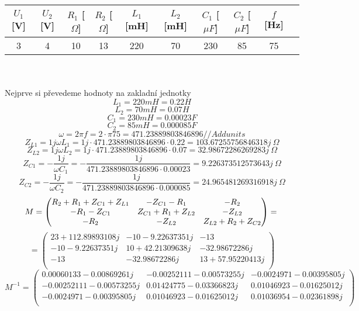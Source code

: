\documentclass{article}
\begin{document}
\begin{tabular}{| c | c | c | c | c | c | c | c | c | c |}
  \hline
   $U_{1}$[V] & $U_{2}$ [V] & $R_{1}$ [$\Omega$]& $R_{2}$ [$\Omega$]& $L_{1}$ [mH]& $L_{2}$ [mH]& $C_{1}$ [$\mu F$]& $C_{2}$ [$\mu F$]& $f$ [Hz]\\
  \hline
  3 & 4 & 10 & 13 & 220 & 70 & 230 & 85 & 75\\ 
  \hline
\end{tabular}\\
\\
Nejprve si převedeme hodnoty na zakladní jednotky\\
\[
  L_1 = 220 mH = 0.22 H
\]
\[
  L_2 = 70 mH = 0.07 H
\]
\[
  C_1 = 230 mH = 0.00023 F
\]
\[
  C_2 = 85 mH = 0.000085 F
\]
\[
  \omega = 2\pi f 
  = 2 \cdot \pi 75
  = 471.23889803846896 // Add units 
\]
\[
  Z_{L1} = 1j \omega L_1
  = 1j \cdot 471.23889803846896 \cdot 0.22 
  = 103.67255756846318j\ \Omega
\]
\[
  Z_{L2} = 1j \omega L_2
  = 1j \cdot 471.23889803846896 \cdot 0.07 
  = 32.98672286269283j \ \Omega
\]
\[
  Z_{C1} = -\displaystyle\frac{1j}{\omega C_1}
  = - \displaystyle\frac{1j}{471.23889803846896 \cdot 0.00023}
  = 9.226373512573643j\ \Omega
\]
\[
  Z_{C2} = -\displaystyle\frac{1j}{\omega C_2}
  = - \displaystyle\frac{1j}{471.23889803846896 \cdot 0.000085}
  = 24.965481269316918j\ \Omega
\]
\[
  M =
  \begin{pmatrix}
    R_2+R_1+Z_{C1}+Z_{L1} & -Z_{C1}-R_1 & -R_2\\
    -R_1-Z_{C1} & Z_{C1}+R_1+Z_{L2} & -Z_{L2}\\
    -R_2 & -Z_{L2} & Z_{L2}+R_2+Z_{C2}\\
  \end{pmatrix}
  =\\
\]
\[
  =
  \begin{pmatrix}
    23+112.89893108j & -10 -9.22637351j & -13\\
    -10 -9.22637351j & 10 +42.21309638j & -32.98672286j\\
    -13 & -32.98672286j & 13 +57.95220413j\\
  \end{pmatrix}
\]
\[
  M^{-1}
  =
  \begin{pmatrix}
    0.00060133-0.00869261j & -0.00252111-0.00573255j & -0.0024971 -0.00395805j\\
    -0.00252111-0.00573255j & 0.01424775-0.03366823j & 0.01046923-0.01625012j\\
    -0.0024971 -0.00395805j & 0.01046923-0.01625012j & 0.01036954-0.02361898j\\
  \end{pmatrix}
\]
\end{document}
